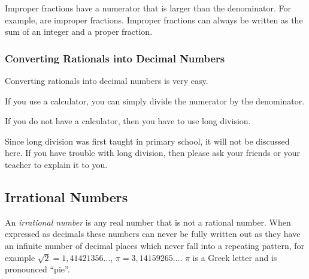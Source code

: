 \documentclass[10pt,a4paper,titlepage,twoside,openright]{report}
\begin{document}
Improper fractions have a numerator that is larger than the denominator. For example,  are improper fractions. Improper fractions can always be written as the sum of an integer and a proper fraction.

\subsubsection{Converting Rationals into Decimal Numbers}
Converting rationals into decimal numbers is very easy. 

If you use a calculator, you can simply divide the numerator by the denominator.

If you do not have a calculator, then you have to use long division. 

Since long division was first taught in primary school, it will not be discussed here. If you have trouble with long division, then please ask your friends or your teacher to explain it to you.


\subsection{Irrational Numbers}
An \textit{irrational number} is any real number that is not a rational number. When expressed as decimals these numbers can never be fully written out as they have an infinite number of decimal places which never fall into a repeating pattern, for example $\sqrt{2} = 1,41421356\ldots$, $\pi = 3,14159265\ldots$. $\pi$ is a Greek letter and is pronounced ``pie''. 

\end{document}
